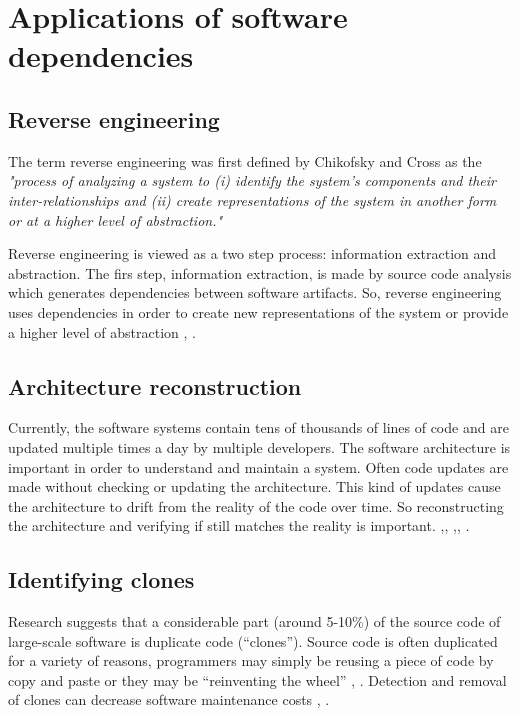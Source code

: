 \documentclass[12pt, a4paper, twoside]{report}
\begin{document}
\section{Applications of software dependencies}
\label{app}

\subsection{Reverse engineering}
The term reverse engineering was first defined by Chikofsky and Cross \cite{ChikofskyReverse} as the \textit{"process of analyzing a system to (i) identify the system’s components and
their inter-relationships and (ii) create representations of the system in another form or at a higher level of abstraction."} 

Reverse engineering is viewed as a two step process: information extraction and abstraction. \cite{FoSEReverseEngineering} 
The firs step, information extraction, is made by source code analysis which generates dependencies between software artifacts. So, reverse engineering uses dependencies in order to create new representations of the system or provide a higher level of abstraction \cite{struct_dep}, \cite{Gueheneuc}.

\subsection{Architecture reconstruction}
Currently, the software systems contain tens of thousands of lines of code and are updated multiple times a day by multiple developers.  
The software architecture is important in order to understand and maintain a system. Often code updates are made without checking or updating the architecture.
This kind of updates cause the architecture to drift from the reality of the code over time. So reconstructing the architecture and verifying if still matches the reality is important. \cite{sar},\cite{PagerankENASE}, \cite{Bass-archreconstruction} ,\cite{RecoverySartipi}, \cite{model-bennett}.

\subsection{Identifying clones}
Research suggests that a considerable part (around 5-10\%) of the source code of large-scale software is duplicate code (“clones”). Source code is often duplicated for a variety of reasons, programmers may simply be reusing a piece of code by copy and paste or they may be “reinventing the wheel” \cite{ClonesMayrand}, \cite{clones}.
Detection and removal of clones can decrease software maintenance costs \cite{CloneDetection}, \cite{cloneKamiya}.
\end{document}
